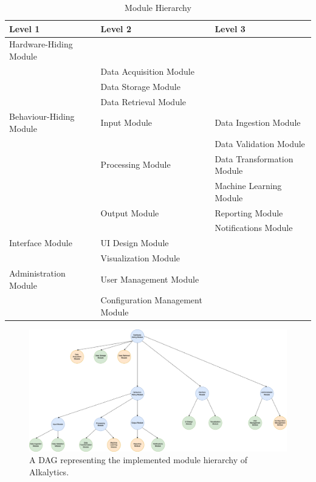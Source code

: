 \documentclass[12pt, titlepage]{article}
\begin{document}
\begin{table}[h!]
\centering
\begin{tabular}{p{} p{} p{}}
\toprule
\textbf{Level 1} & \textbf{Level 2} & \textbf{Level 3}\\
\midrule

{Hardware-Hiding Module} & ~ & ~ \\
& Data Acquisition Module & \\
& Data Storage Module & \\
& Data Retrieval Module & \\
\midrule

{Behaviour-Hiding Module} & Input Module & Data Ingestion Module\\
& & Data Validation Module\\
& Processing Module & Data Transformation Module\\
& & Machine Learning Module\\
& Output Module & Reporting Module\\
& & Notifications Module\\
\midrule

{Interface Module} & UI Design Module & \\
& Visualization Module & \\
\midrule

{Administration Module} & User Management Module & \\
& Configuration Management Module & \\
\bottomrule

\end{tabular}
\caption{Module Hierarchy}
\label{TblMH}
\end{table}

\begin{figure}[htbp]
  \centering
  \includegraphics[width=\textwidth]{Diagrams/DAG.png}
  \caption{A DAG representing the implemented module hierarchy of Alkalytics.}
  \label{fig:FigMH}
\end{figure}
\end{document}
